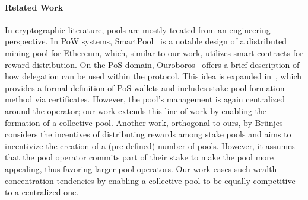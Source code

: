 \paragraph{Related Work}
In cryptographic literature, pools are mostly treated from an engineering
perspective. In PoW systems, SmartPool~\cite{USENIX:LVTS17} is a notable design
of a distributed mining pool for Ethereum, which, similar to our work, utilizes
smart contracts for reward distribution.  On the PoS domain,
Ouroboros~\cite{C:KRDO17} offers a brief description of how delegation can be
used within the protocol. This idea is expanded in~\cite{SCN:KarKiaLar20},
which provides a formal definition of PoS wallets and includes stake pool
formation method via certificates. However, the pool's management is again
centralized around the operator; our work extends this line of work by enabling
the formation of a collective pool. Another work, orthogonal to ours, by
Br{\"{u}}njes \etal~\cite{DBLP:conf/eurosp/BrunjesKKS20} considers the
incentives of distributing rewards among stake pools and aims to incentivize
the creation of a (pre-defined) number of pools. However, it assumes that the
pool operator commits part of their stake to make the pool more appealing, thus
favoring larger pool operators. Our work eases such wealth concentration
tendencies by enabling a collective pool to be equally competitive to a
centralized one.
